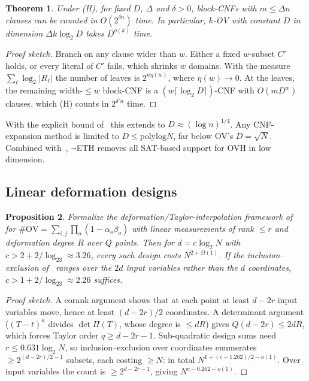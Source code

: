 \documentclass[11pt,a4paper]{article}
\theoremstyle{plain}
\newtheorem{theorem}{Theorem}
\newtheorem{proposition}[theorem]{Proposition}
\theoremstyle{definition}
\theoremstyle{remark}
\newcommand{\OV}{\mathrm{OV}}
\begin{document}
\begin{theorem}\label{thm:block}
Under (H), for fixed $D$, $\Delta$ and $\delta>0$, block-CNFs with $m\le\Delta n$ clauses can be counted in
$O(2^{\delta n})$ time. In particular, $k$-OV with constant $D$ in dimension $\Delta k\log_2D$ takes $D^{o(k)}$ time.
\end{theorem}
\begin{proof}[Proof sketch]
Branch on any clause wider than $w$. Either a fixed $w$-subset $C'$ holds, or every literal of $C'$ fails, which
shrinks $w$ domains. With the measure $\sum_\ell\log_2|R_\ell|$ the number of leaves is $2^{n\eta(w)}$, where
$\eta(w)\to0$. At the leaves, the remaining width-$\le w$ block-CNF is a $(w\lceil\log_2D\rceil)$-CNF with
$O(mD^w)$ clauses, which (H) counts in $2^{\delta'n}$ time.
\end{proof}
With the explicit bound of~\cite{Anthropic26} this extends to $D\approx(\log n)^{1/4}$. Any CNF-expansion method is
limited to $D\le\mathrm{polylog}N$, far below OV's $D=\sqrt N$. Combined with~\cite[Lemma~12]{CIP06}, $\neg$ETH removes
all SAT-based support for OVH in low dimension.

\subsection{Linear deformation designs}
\begin{proposition}\label{prop:deform}
Formalize the deformation/Taylor-interpolation framework of~\cite{OpenAI26} for $\#\OV=\sum_{i,j}\prod_o(1-\alpha_o\beta_o)$
with linear measurements of rank $\le r$ and deformation degree $R$ over $Q$ points. Then for $d=c\log_2N$ with
$c>2+2/\log_23\approx3.26$, every such design costs $N^{2+\Omega(1)}$. If the inclusion--exclusion of~\cite{OpenAI26}
ranges over the $2d$ input variables rather than the $d$ coordinates, $c>1+2/\log_23\approx2.26$ suffices.
\end{proposition}
\begin{proof}[Proof sketch]
A corank argument shows that at each point at least $d-2r$ input variables move, hence at least $(d-2r)/2$
coordinates. A determinant argument ($(T-t)^\kappa$ divides $\det\Pi(T)$, whose degree is $\le dR$) gives
$Q(d-2r)\le2dR$, which forces Taylor order $q\ge d-2r-1$. Sub-quadratic design sums need $r\le0.631\log_2N$, so
inclusion--exclusion over coordinates enumerates $\ge2^{(d-2r)/2-1}$ subsets, each costing $\ge N$: in total
$N^{1+(c-1.262)/2-o(1)}$. Over input variables the count is $\ge2^{d-2r-1}$, giving $N^{c-0.262-o(1)}$.
\end{proof}
\end{document}
